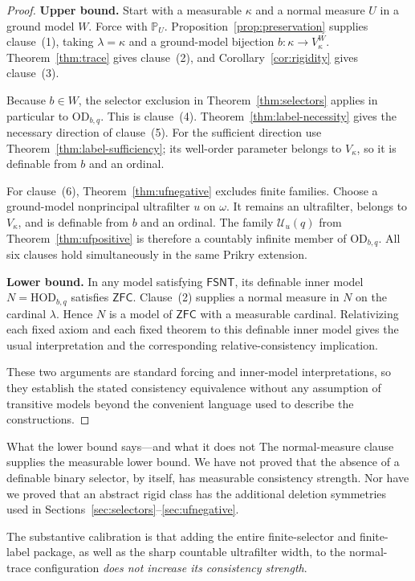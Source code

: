 \documentclass[11pt,letterpaper]{article}
\theoremstyle{definition}
\numberwithin{equation}{section}
\newcommand{\ZFC}{\mathsf{ZFC}}
\newcommand{\HOD}{\mathrm{HOD}}
\newcommand{\OD}{\mathrm{OD}}
\newcommand{\UU}{\mathscr U}
\newcommand{\FinSym}{\mathsf{FSNT}}
\newcommand{\PPU}{\mathbb P_U}
\begin{document}
\begin{proof}
\textbf{Upper bound.}
Start with a measurable $\kappa$ and a normal measure $U$ in a ground model $W$. Force with $\PPU$. Proposition~\ref{prop:preservation} supplies clause~(1), taking $\lambda=\kappa$ and a ground-model bijection $b:\kappa\to V_\kappa^W$. Theorem~\ref{thm:trace} gives clause~(2), and Corollary~\ref{cor:rigidity} gives clause~(3).

Because $b\in W$, the selector exclusion in Theorem~\ref{thm:selectors} applies in particular to $\OD_{b,q}$. This is clause~(4). Theorem~\ref{thm:label-necessity} gives the necessary direction of clause~(5). For the sufficient direction use Theorem~\ref{thm:label-sufficiency}; its well-order parameter belongs to $V_\kappa$, so it is definable from $b$ and an ordinal.

For clause~(6), Theorem~\ref{thm:ufnegative} excludes finite families. Choose a ground-model nonprincipal ultrafilter $u$ on $\omega$. It remains an ultrafilter, belongs to $V_\kappa$, and is definable from $b$ and an ordinal. The family $\UU_u(q)$ from Theorem~\ref{thm:ufpositive} is therefore a countably infinite member of $\OD_{b,q}$. All six clauses hold simultaneously in the same Prikry extension.

\textbf{Lower bound.}
In any model satisfying $\FinSym$, its definable inner model $N=\HOD_{b,q}$ satisfies $\ZFC$. Clause~(2) supplies a normal measure in $N$ on the cardinal $\lambda$. Hence $N$ is a model of $\ZFC$ with a measurable cardinal. Relativizing each fixed axiom and each fixed theorem to this definable inner model gives the usual interpretation and the corresponding relative-consistency implication.

These two arguments are standard forcing and inner-model interpretations, so they establish the stated consistency equivalence without any assumption of transitive models beyond the convenient language used to describe the constructions.
\end{proof}

\begin{assessment}{What the lower bound says---and what it does not}
The normal-measure clause supplies the measurable lower bound. We have not proved that the absence of a definable binary selector, by itself, has measurable consistency strength. Nor have we proved that an abstract rigid class has the additional deletion symmetries used in Sections~\ref{sec:selectors}--\ref{sec:ufnegative}.

The substantive calibration is that adding the entire finite-selector and finite-label package, as well as the sharp countable ultrafilter width, to the normal-trace configuration \emph{does not increase its consistency strength}.
\end{assessment}
\end{document}
